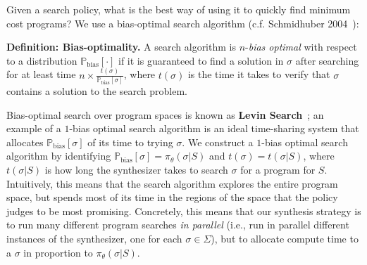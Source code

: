 \documentclass{article}
\newcommand{\probability}{\mathds{P}} %
\theoremstyle{definition}
\begin{document}
Given a search policy, what is the best way of using it to quickly find minimum cost programs?
We use a bias-optimal search algorithm (c.f. Schmidhuber 2004~\citep{schmidhuber2004optimal}):

\noindent\textbf{Definition: Bias-optimality.} 
   A search algorithm is $n$-\emph{bias optimal}
with respect to a distribution $\probability_{\text{bias}}[\cdot ]$ if it is
guaranteed to find a solution in $\sigma $ after searching for at least time
$n\times\frac{t(\sigma )}{\probability_{\text{bias}}[\sigma ]}$, where $t(\sigma )$ is the time it
takes to verify that $\sigma $ contains a solution to the
search problem.




Bias-optimal search over program spaces is known as \textbf{Levin Search}~\cite{levin1973universal}; an example of a $1$-bias optimal search algorithm is an ideal time-sharing system that allocates $\probability_{\text{bias}}[\sigma ]$ of its time to trying $\sigma $.  We construct a $1$-bias optimal search algorithm by identifying $\probability_{\text{bias}}[\sigma ] = \pi_\theta(\sigma |S)$ and $t(\sigma )  = t(\sigma|S)$, where $t(\sigma|S)$ is how long the synthesizer takes to search $\sigma $ for a program for $S$. Intuitively, this means that the search algorithm explores the entire program space, but spends most of its time in the regions of the space that  the policy judges to be most promising.
Concretely,
this means that our
synthesis strategy is to
run many different
program searches \emph{in parallel} (i.e., run in parallel different instances of the synthesizer, one for each  $\sigma\in \Sigma$),
but to allocate
compute time to a $\sigma $ in proportion to $\pi_\theta(\sigma |S)$.
\end{document}
